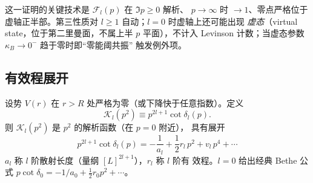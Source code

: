 \begin{remark}
这一证明的关键技术是 $\mathcal F_l(p)$ 在 $\Im p\ge 0$ 解析、
$p\to\infty$ 时 $\to 1$、零点严格位于虚轴正半部。第三性质对
$l\ge 1$ 自动；$l=0$ 时虚轴上还可能出现 \emph{虚态}（virtual
state，位于第二里曼面，不属上半 $p$ 平面），不计入 Levinson
计数；当虚态参数 $\kappa_B\to 0^-$ 趋于零时即“零能阈共振”
触发例外项。
\end{remark}

\subsection{有效程展开}\label{sec:pw-eff-range}

\begin{theorem}[$l$ 阶有效程展开]\label{thm:pw-eff-range}
设势 $V(r)$ 在 $r>R$ 处严格为零（或下降快于任意指数）。定义
\begin{equation}\label{eq:pw-Kl-def}
\mathcal K_l(p^2)\equiv p^{2l+1}\cot\delta_l(p).
\end{equation}
则 $\mathcal K_l(p^2)$ 是 $p^2$ 的解析函数（在 $p=0$ 附近），
具有展开
\begin{equation}\label{eq:pw-eff-range-l}
\boxed{\;p^{2l+1}\cot\delta_l(p)
=-\frac{1}{a_l}+\frac{1}{2}r_l\,p^2+v_l\,p^4+\cdots\;}
\end{equation}
$a_l$ 称 $l$ 阶散射长度（量纲 $[L]^{2l+1}$），$r_l$ 称 $l$ 阶有
效程。$l=0$ 给出经典 Bethe 公式
$p\cot\delta_0=-1/a_0+\tfrac12 r_0 p^2+\cdots$。
\end{theorem}

